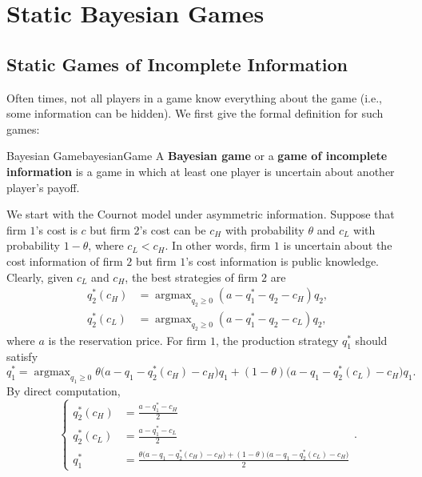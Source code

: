 \documentclass[math]{amznotes}
\theoremstyle{remark}
\DeclareMathOperator*{\argmax}{argmax}
\begin{document}
\chapter{Static Bayesian Games}
\section{Static Games of Incomplete Information}
Often times, not all players in a game know everything about the game (i.e., some information can be hidden). We first give the formal definition for such games:
\begin{dfnbox}{Bayesian Game}{bayesianGame}
    A {\color{red} \textbf{Bayesian game}} or a {\color{red} \textbf{game of incomplete information}} is a game in which at least one player is uncertain about another player's payoff.
\end{dfnbox}
We start with the Cournot model under asymmetric information. Suppose that firm $1$'s cost is $c$ but firm $2$'s cost can be $c_H$ with probability $\theta$ and $c_L$ with probability $1 - \theta$, where $c_L < c_H$. In other words, firm $1$ is uncertain about the cost information of firm $2$ but firm $1$'s cost information is public knowledge. Clearly, given $c_L$ and $c_H$, the best strategies of firm $2$ are 
\begin{align*}
    q_2^*\left(c_H\right) & = \argmax_{q_2 \geq 0}\left(a - q_1^* - q_2 - c_H\right)q_2, \\
    q_2^*\left(c_L\right) & = \argmax_{q_2 \geq 0}\left(a - q_1^* - q_2 - c_L\right)q_2,
\end{align*}
where $a$ is the reservation price. For firm $1$, the production strategy $q_1^*$ should satisfy
\begin{equation*}
    q_1^* = \argmax_{q_1 \geq 0}\theta\bigl(a - q_1 - q_2^*\left(c_H\right) - c_H\bigr)q_1 + \left(1 - \theta\right)\bigl(a - q_1 - q_2^*\left(c_L\right) - c_H\bigr)q_1.
\end{equation*}
By direct computation, 
\begin{equation*}
    \begin{cases}
        q_2^*\left(c_H\right) & = \frac{a - q_1^* - c_H}{2} \\
        q_2^*\left(c_L\right) & = \frac{a - q_1^* - c_L}{2} \\
        q_1^* & = \frac{\theta\bigl(a - q_1 - q_2^*\left(c_H\right) - c_H\bigr) + \left(1 - \theta\right)\bigl(a - q_1 - q_2^*\left(c_L\right) - c_H\bigr)}{2}
    \end{cases}.
\end{equation*}
\end{document}
